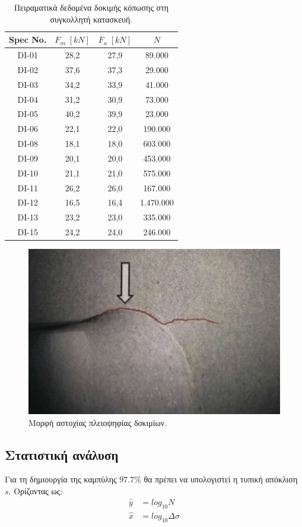 \documentclass{article}
\begin{document}
\begin{table}[H]
    \centering
    \begin{tabular}{|c|c|c|c|}
        \hline
        \rowcolor{Dandelion}
        Spec No. & $F_m\; [kN]$ & $F_a\; [kN]$ & $N$\\
        \hline
        DI-01 & 28,2 & 27,9 & 89.000\\ \hline
        DI-02 & 37,6 & 37,3 & 29.000\\ \hline
        DI-03 & 34,2 & 33,9 & 41.000\\ \hline
        DI-04 & 31,2 & 30,9 & 73.000\\ \hline
        DI-05 & 40,2 & 39,9 & 23.000\\ \hline
        DI-06 & 22,1 & 22,0 & 190.000\\ \hline
        DI-08 & 18,1 & 18,0 & 603.000\\ \hline
        DI-09 & 20,1 & 20,0 & 453.000\\ \hline
        DI-10 & 21,1 & 21,0 & 575.000\\ \hline
        DI-11 & 26,2 & 26,0 & 167.000\\ \hline
        DI-12 & 16,5 & 16,4 & 1.470.000\\ \hline
        DI-13 & 23,2 & 23,0 & 335.000\\ \hline
        DI-15 & 24,2 & 24,0 & 246.000\\ \hline
    \end{tabular}
    \caption{Πειραματικά δεδομένα δοκιμής κόπωσης στη συγκολλητή κατασκευή.}
    \label{tab:spec}
\end{table}

\begin{figure}[H]
    \centering
    \includegraphics[width=0.5\linewidth]{media/astoxia.png}
    \caption{Μορφή αστοχίας πλειοψηφίας δοκιμίων.}
    \label{fig:astoxia}
\end{figure}

\subsection{Στατιστική ανάλυση}
Για τη δημιουργία της καμπύλης $97.7\%$ θα πρέπει να υπολογιστεί η τυπική απόκλιση $s$. Ορίζοντας ως:
\begin{align}
    \hat{y} &= log_{10} N\\
    \hat{x} &= log_{10} \Delta \sigma
\end{align}
\end{document}

